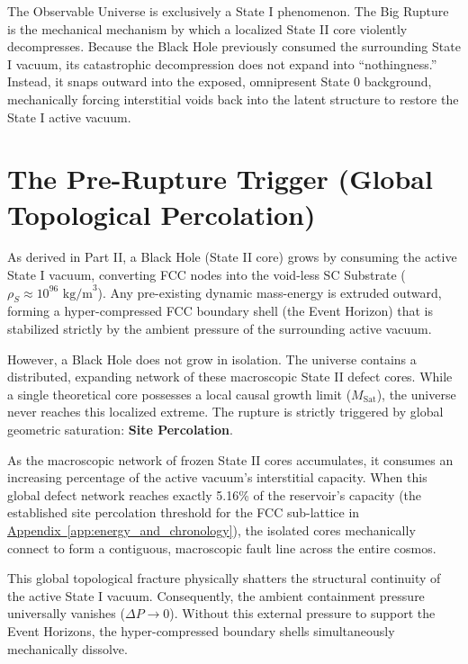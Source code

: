 The Observable Universe is exclusively a State I phenomenon. The Big Rupture is the mechanical mechanism by which a localized State II core violently decompresses. Because the Black Hole previously consumed the surrounding State I vacuum, its catastrophic decompression does not expand into ``nothingness.'' Instead, it snaps outward into the exposed, omnipresent State 0 background, mechanically forcing interstitial voids back into the latent structure to restore the State I active vacuum.

\section{The Pre-Rupture Trigger (Global Topological Percolation)}

As derived in Part II, a Black Hole (State II core) grows by consuming the active State I vacuum, converting FCC nodes into the void-less SC Substrate ($\rho_S \approx 10^{96} \text{ kg/m}^3$). Any pre-existing dynamic mass-energy is extruded outward, forming a hyper-compressed FCC boundary shell (the Event Horizon) that is stabilized strictly by the ambient pressure of the surrounding active vacuum.

However, a Black Hole does not grow in isolation. The universe contains a distributed, expanding network of these macroscopic State II defect cores. While a single theoretical core possesses a local causal growth limit ($M_{\text{Sat}}$), the universe never reaches this localized extreme. The rupture is strictly triggered by global geometric saturation: \textbf{Site Percolation}.

As the macroscopic network of frozen State II cores accumulates, it consumes an increasing percentage of the active vacuum's interstitial capacity. When this global defect network reaches exactly 5.16\% of the reservoir's capacity (the established site percolation threshold for the FCC sub-lattice in \hyperref[app:energy_and_chronology]{Appendix~\ref*{app:energy_and_chronology}}), the isolated cores mechanically connect to form a contiguous, macroscopic fault line across the entire cosmos.

This global topological fracture physically shatters the structural continuity of the active State I vacuum. Consequently, the ambient containment pressure universally vanishes ($\Delta P \to 0$). Without this external pressure to support the Event Horizons, the hyper-compressed boundary shells simultaneously mechanically dissolve.

